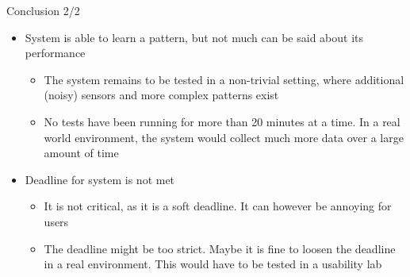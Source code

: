 \begin{frame}{Conclusion 2/2}
	\begin{itemize}
    \item System is able to learn a pattern, but not much can be said about its performance
      \begin{itemize}
        \item The system remains to be tested in a non-trivial setting, where additional (noisy) sensors and more complex patterns exist
        \item No tests have been running for more than 20 minutes at a time. In a real world environment, the system would collect much more data over a large amount of time
      \end{itemize}
		\item Deadline for system is not met
      \begin{itemize}
      \item It is not critical, as it is a soft deadline. It can however be annoying for users
      \item The deadline might be too strict. Maybe it is fine to loosen the deadline in a real environment. This would have to be tested in a usability lab
      \end{itemize}
	\end{itemize}
\end{frame}